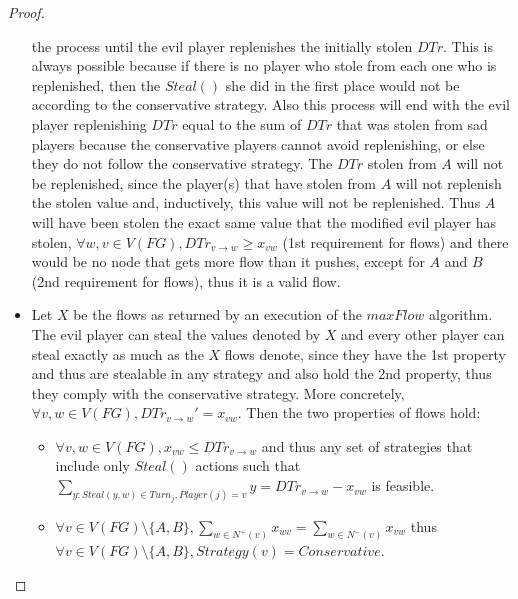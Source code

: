 \documentclass[11pt]{article}
\theoremstyle{definition}
\theoremstyle{corollary}
\theoremstyle{lemma}
\begin{document}
\begin{proof}
\begin{itemize}
          the process until the evil player replenishes the initially stolen $DTr$. This is always possible because if there
          is no player who stole from each one who is replenished, then the $Steal()$ she did in the first place would not be
          according to the conservative strategy. Also this process will end with the evil player replenishing $DTr$ equal
          to the sum of $DTr$ that was stolen from sad players because the conservative players cannot avoid replenishing,
          or else they do not follow the conservative strategy. The $DTr$ stolen from $A$ will not be replenished, since
          the player(s) that have stolen from $A$ will not replenish the stolen value and, inductively, this value will not
          be replenished. Thus $A$ will have been stolen the exact same value that the modified evil player has stolen,
          $\forall w,v \in V(FG), DTr_{v \rightarrow w} \geq x_{vw}$ (1st requirement for flows) and there would be no node
          that gets more flow than it pushes, except for $A$ and $B$ (2nd requirement for flows), thus it is a valid flow.
          \item Let $X$ be the flows as returned by an execution of the $maxFlow$ algorithm. The evil player can steal
          the values denoted by $X$ and every other player can steal exactly as much as the $X$ flows denote, since they
          have the 1st property and thus are stealable in any strategy and also hold the 2nd property, thus they comply with
          the conservative strategy. More concretely, $\forall v,w \in V(FG), DTr_{v \rightarrow w}' = x_{vw}$. Then the two
          properties of flows hold:
          \begin{itemize}
             \item $\forall v,w \in V(FG),x_{vw} \leq DTr_{v \rightarrow w}$ and thus any set of strategies that include only
             $Steal()$ actions such that $\sum\limits_{y : Steal(y,w) \in Turn_j, Player(j) = v}y = DTr_{v \rightarrow w} -
             x_{vw}$ is feasible.
             \item $\forall v \in V(FG) \setminus \{A,B\}, \sum\limits_{w \in N^{+}(v)}x_{wv} =
             \sum\limits_{w \in N^{-}(v)}x_{vw}$ thus $\forall v \in V(FG) \setminus \{A,B\}, Strategy(v) = Conservative$.
          \end{itemize}
             

\end{itemize}
\end{proof}
\end{document}
